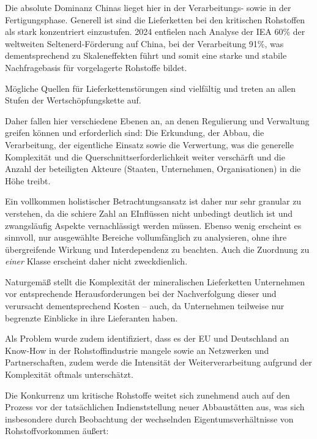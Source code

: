 \documentclass[12pt,a4paper,oneside]{book} %
\begin{document}
{	
	
	Die absolute Dominanz Chinas lieget hier in der Verarbeitungs- sowie in der Fertigungsphase. Generell ist sind die Lieferketten bei den kritischen Rohstoffen als stark konzentriert einzustufen. 2024 entfielen nach Analyse der IEA 60\% der weltweiten Seltenerd-Förderung auf China, bei der Verarbeitung 91\%, was dementsprechend zu Skaleneffekten führt und somit eine starke und stabile Nachfragebasis für vorgelagerte Rohstoffe bildet.\autocite{IEA, Rare Earth Elements Pathways to secure and diversified supply chains, S. 7}
	
	
	
	Mögliche Quellen für Lieferkettenstörungen sind vielfältig und treten an allen Stufen der Wertschöpfungskette auf.
	
	
	Daher fallen hier verschiedene Ebenen an, an denen Regulierung und Verwaltung greifen können und erforderlich sind: Die Erkundung, der Abbau, die Verarbeitung, der eigentliche Einsatz sowie die Verwertung, was die generelle Komplexität und die Querschnittserforderlichkeit weiter verschärft und die Anzahl der beteiligten Akteure (Staaten, Unternehmen, Organisationen) in die Höhe treibt.
	
	Ein vollkommen holistischer Betrachtungsansatz ist daher nur sehr granular zu verstehen, da die schiere Zahl an EInflüssen nicht unbedingt deutlich ist und zwangsläufig Aspekte vernachlässigt werden müssen. Ebenso wenig erscheint es sinnvoll, nur ausgewählte Bereiche vollumfänglich zu analysieren, ohne ihre übergreifende Wirkung und Interdependenz zu beachten. Auch die Zuordnung zu \textit{einer} Klasse erscheint daher nicht zweckdienlich.
	
	Naturgemäß stellt die Komplexität der mineralischen Lieferketten Unternehmen vor entsprechende Herausforderungen bei der Nachverfolgung dieser und verursacht dementsprechend Kosten -- auch, da Unternehmen teilweise nur begrenzte Einblicke in ihre Lieferanten haben.\autocite{Jumping the Chain: How Downstream Manufacturers Engage with Deep Suppliers of Conflict Minerals}
	
	Als Problem wurde zudem identifiziert, dass es der EU und Deutschland an Know-How in der Rohstoffindustrie mangele sowie an Netzwerken und Partnerschaften, zudem werde die Intensität der Weiterverarbeitung aufgrund der Komplexität oftmals unterschätzt.\autocite{FAZ Offenbarungseid}
	
	Die Konkurrenz um kritische Rohstoffe weitet sich zunehmend auch auf den Prozess vor der tatsächlichen Indienststellung neuer Abbaustätten aus, was sich insbesondere durch Beobachtung der wechselnden Eigentumsverhältnisse von Rohstoffvorkommen äußert:
	
}
\end{document}
